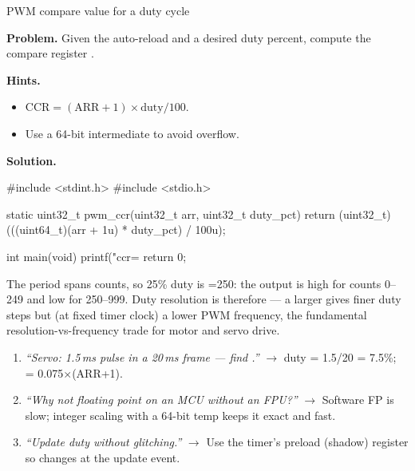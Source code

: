 \begin{gymproblem}{PWM compare value for a duty cycle}

\textbf{Problem.} Given the auto-reload  and a desired duty percent,
compute the compare register .

\textbf{Hints.}
\begin{itemize}
\item $\text{CCR} = (\text{ARR}+1)\times\text{duty}/100$.
\item Use a 64-bit intermediate to avoid overflow.
\end{itemize}

\attempt

\textbf{Solution.}
\begin{cgym}
#include <stdint.h>
#include <stdio.h>

static uint32_t pwm_ccr(uint32_t arr, uint32_t duty_pct) {
    return (uint32_t)(((uint64_t)(arr + 1u) * duty_pct) / 100u);
}

int main(void) {
    printf("ccr=%
    return 0;
}
\end{cgym}

The period spans  counts, so 25\% duty is =250: the output
is high for counts 0--249 and low for 250--999. Duty resolution is therefore
 --- a larger  gives finer duty steps but (at fixed
timer clock) a lower PWM frequency, the fundamental resolution-vs-frequency
trade for motor and servo drive.

\followups
\begin{enumerate}
\item \emph{``Servo: 1.5\,ms pulse in a 20\,ms frame --- find .''}
  $\rightarrow$ duty = 1.5/20 = 7.5\%;  = 0.075$\times$(ARR+1).
\item \emph{``Why not floating point on an MCU without an FPU?''}
  $\rightarrow$ Software FP is slow; integer scaling with a 64-bit temp keeps
  it exact and fast.
\item \emph{``Update duty without glitching.''} $\rightarrow$ Use the timer's
  preload (shadow) register so  changes at the update event.
\end{enumerate}
\end{gymproblem}

